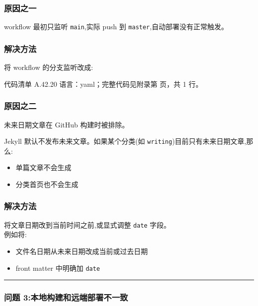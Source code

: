 \documentclass[lang=cn,scheme=chinese,color=blue,device=normal,toc=onecol,math=cm]{elegantbook}
\begin{document}
\subsubsection{原因之一}


workflow 最初只监听 \texttt{main},实际 push 到 \texttt{master},自动部署没有正常触发。\par


\subsubsection{解决方法}


将 workflow 的分支监听改成:\par


\begin{codeindexbox}{代码清单 A.42.20}
语言：yaml；完整代码见附录第 \pageref{code:42:20} 页，共 1 行。
\end{codeindexbox}


\subsubsection{原因之二}


未来日期文章在 GitHub 构建时被排除。\par


Jekyll 默认不发布未来文章。如果某个分类(如 \texttt{writing})目前只有未来日期文章,那么:\par


\begin{itemize}
\item 单篇文章不会生成
\item 分类首页也不会生成
\end{itemize}


\subsubsection{解决方法}


将文章日期改到当前时间之前,或显式调整 \texttt{date} 字段。\\ 例如将:\par


\begin{itemize}
\item 文件名日期从未来日期改成当前或过去日期
\item front matter 中明确加 \texttt{date}
\end{itemize}


\medskip\hrule\medskip


\subsubsection{问题 3:本地构建和远端部署不一致}
\end{document}
